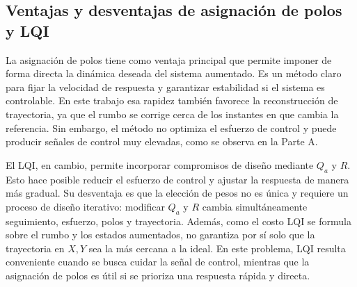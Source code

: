 \subsection{Ventajas y desventajas de asignación de polos y LQI}

La asignación de polos tiene como ventaja principal que permite imponer de forma directa la dinámica deseada del sistema aumentado. Es un método claro para fijar la velocidad de respuesta y garantizar estabilidad si el sistema es controlable. En este trabajo esa rapidez también favorece la reconstrucción de trayectoria, ya que el rumbo se corrige cerca de los instantes en que cambia la referencia. Sin embargo, el método no optimiza el esfuerzo de control y puede producir señales de control muy elevadas, como se observa en la Parte A.

El LQI, en cambio, permite incorporar compromisos de diseño mediante $Q_a$ y $R$. Esto hace posible reducir el esfuerzo de control y ajustar la respuesta de manera más gradual. Su desventaja es que la elección de pesos no es única y requiere un proceso de diseño iterativo: modificar $Q_a$ y $R$ cambia simultáneamente seguimiento, esfuerzo, polos y trayectoria. Además, como el costo LQI se formula sobre el rumbo y los estados aumentados, no garantiza por sí solo que la trayectoria en $X,Y$ sea la más cercana a la ideal. En este problema, LQI resulta conveniente cuando se busca cuidar la señal de control, mientras que la asignación de polos es útil si se prioriza una respuesta rápida y directa.

\FloatBarrier
